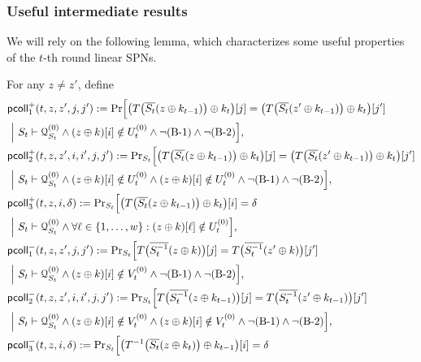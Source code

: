 \subsubsection{Useful intermediate results}



We will rely on the following lemma, which characterizes some useful properties of the $t$-th round linear SPNs.

\begin{lemma}
	\label{lemma:coll-prob}
	
	For any $z\neq z'$, define
	\begin{align*}
	&\pcoll_{1}^+(t,z,z',j,j')  :={\Pr}\Big[\big(T\big(\overline{S_t}(z\xor k_{t-1})\big)\xor k_t\big)[j]=\big(T\big(\overline{S_t}(z'\xor k_{t-1})\big)\xor k_t\big)[j']       \\
	&~\Big|~S_t\vdash\mathcal{Q}_{S_t}^{(0)}\wedge(z\xor k)[i]\notin U_t^{(0)}\wedge\neg\bone\wedge\neg\btwo\Big],         \\
	&\pcoll_{2}^+(t,z,z',i,i',j,j')      :={\Pr}_{S_t}\Big[\big(T\big(\overline{S_t}(z\xor k_{t-1})\big)\xor k_t\big)[j]=\big(T\big(\overline{S_t}(z'\xor k_{t-1})\big)\xor k_t\big)[j']   \\
	&~\Big|~S_t\vdash\mathcal{Q}_{S_t}^{(0)}\wedge(z\xor k)[i]\notin U_t^{(0)}\wedge(z\xor k)[i]\notin U_t^{(0)}\wedge\neg\bone\wedge\neg\btwo\Big],         \\
	&\pcoll_{3}^+(t,z,i,\delta)      :={\Pr}_{S_t}\Big[\big(T\big(\overline{S_t}(z\xor k_{t-1})\big)\xor k_t\big)[i]=\delta    \\
	&~\Big|~S_t\vdash\mathcal{Q}_{S_t}^{(0)}\wedge\forall\ell\in\{1,\ldots,w\}:(z\xor k)[\ell]\notin U_t^{(0)}\Big],         \\
	&\pcoll_{1}^-(t,z,z',j,j')     :={\Pr}_{S_t}\Big[T\big(\overline{S_t^{-1}}(z\xor k)\big)[j]=T\big(\overline{S_t^{-1}}(z'\xor k)\big)[j']    \\
	&~\Big|~S_t\vdash\mathcal{Q}_{S_t}^{(0)}\wedge(z\xor k)[i]\notin V_t^{(0)}\wedge\neg\bone\wedge\neg\btwo\Big],         \\
	&\pcoll_{2}^-(t,z,z',i,i',j,j')    :={\Pr}_{S_t}\Big[T\big(\overline{S_t^{-1}}(z\xor k_{t-1})\big)[j]=T\big(\overline{S_t^{-1}}(z'\xor k_{t-1})\big)[j']     \\
	&~\Big|~S_t\vdash\mathcal{Q}_{S_t}^{(0)}\wedge(z\xor k)[i]\notin V_t^{(0)}\wedge(z\xor k)[i]\notin V_t^{(0)}\wedge\neg\bone\wedge\neg\btwo\Big],         \\
	&\pcoll_{3}^-(t,z,i,\delta)      :={\Pr}_{S_t}\Big[\big(T^{-1}\big(\overline{S_t}(z\xor k_t)\big)\xor k_{t-1}\big)[i]=\delta    \\

\end{align*}
\end{lemma}

